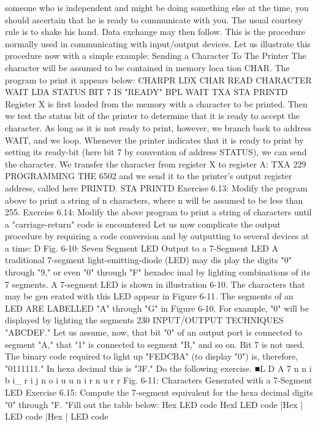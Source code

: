 \documentclass{book}
\begin{document}
someone who is independent and might be doing something else
at the time, you should ascertain that he is ready to communicate
with you. The usual courtesy rule is to shake his hand. Data
exchange may then follow. This is the procedure normally used in
communicating with input/output devices.
Let us illustrate this procedure now with a simple example:
Sending a Character To The Printer
The character will be assumed to be contained in memory loca
tion CHAR. The program to print it appears below:
CHARPR LDX CHAR READ CHARACTER
WAIT LDA STATUS BIT 7 IS "READY"
BPL WAIT
TXA
STA PRINTD
Register X is first loaded from the memory with a character to
be printed. Then we test the status bit of the printer to determine
that it is ready to accept the character. As long as it is not ready to
print, however, we branch back to address WAIT, and we loop.
Whenever the printer indicates that it is ready to print by setting
its ready-bit (here bit 7 by convention of address STATUS), we
can send the character. We transfer the character from register X
to register A:
TXA
229
PROGRAMMING THE 6502
and we send it to the printer's output register address, called here
PRINTD.
STA PRINTD
Exercise 6.13: Modify the program above to print a string of n
characters, where n will be assumed to be less than 255.
Exercise 6.14: Modify the above program to print a string of
characters until a "carriage-return" code is encountered
Let us now complicate the output procedure by requiring a code
conversion and by outputting to several devices at a time:
D
Fig. 6-10: Seven Segment LED
Output to a 7-Segment LED
A traditional 7-segment light-emitting-diode (LED) may dis
play the digits "0" through "9," or even "0" through "F" hexadec
imal by lighting combinations of its 7 segments. A 7-segment
LED is shown in illustration 6-10. The characters that may be gen
erated with this LED appear in Figure 6-11. The segments of an LED
ARE LABELLED "A" through "G" in Figure 6-10.
For example, "0" will be displayed by lighting the segments
230
INPUT/OUTPUT TECHNIQUES
"ABCDEF." Let us assume, now, that bit "0" of an output port is
connected to segment "A," that "1" is connected to segment "B,"
and so on. Bit 7 is not used. The binary code required to light up
"FEDCBA" (to display "0") is, therefore, "0111111." In hexa
decimal this is "3F." Do the following exercise.
■L
D
A
7
n
n
i
b
i_
r
i
j
n
o
i
u
u
n
i
r
n
u
r
r
Fig. 6-11: Characters Generated with a 7-Segment LED
Exercise 6.15: Compute the 7-segment equivalent for the hexa
decimal digits "0" through "F. "Fill out the table below:
Hex LED code Hexl LED code |Hex | LED code |Hex | LED code
\end{document}
